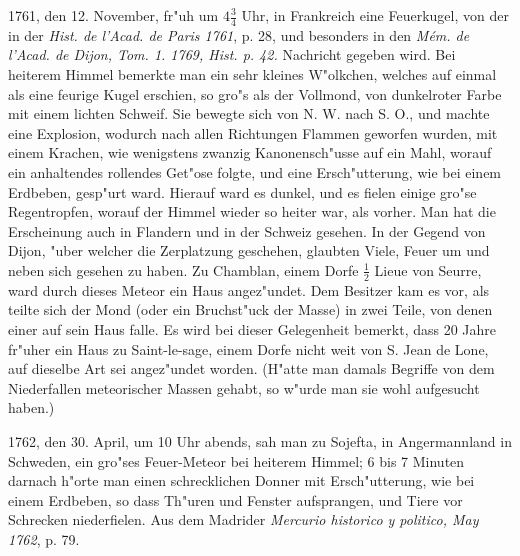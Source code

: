 \documentclass[a4paper, 11pt, oneside, polutonikogreek, german]{article}
\begin{document}
1761, den 12. November, fr"uh um $\mathfrak{4\frac{3}{4}}$ Uhr, in Frankreich eine Feuerkugel, von der in der \emph{Hist. de l'Acad. de Paris 1761}, p. 28, und besonders in den \emph{Mém. de l'Acad. de Dijon, Tom. 1. 1769, Hist. p. 42.} Nachricht gegeben wird. Bei heiterem Himmel bemerkte man ein sehr kleines W"olkchen, welches auf einmal als eine feurige Kugel erschien, so gro"s als der Vollmond, von dunkelroter Farbe mit einem lichten Schweif. Sie bewegte sich von N. W. nach S. O., und machte eine Explosion, wodurch nach allen Richtungen Flammen geworfen wurden, mit einem Krachen, wie wenigstens zwanzig Kanonensch"usse auf ein Mahl, worauf ein anhaltendes rollendes Get"ose folgte, und eine Ersch"utterung, wie bei einem Erdbeben, gesp"urt ward. Hierauf ward es dunkel, und es fielen einige gro"se Regentropfen, worauf der Himmel wieder so heiter war, als vorher. Man hat die Erscheinung auch in Flandern und in der Schweiz gesehen. In der Gegend von Dijon, "uber welcher die Zerplatzung geschehen, glaubten Viele, Feuer um und neben sich gesehen zu haben. Zu Chamblan, einem Dorfe $\mathfrak{\frac{1}{2}}$ Lieue von Seurre, ward durch dieses Meteor ein Haus angez"undet. Dem Besitzer kam es vor, als teilte sich der Mond (oder ein Bruchst"uck der Masse) in zwei Teile, von denen einer auf sein Haus falle. Es wird bei dieser Gelegenheit bemerkt, dass 20 Jahre fr"uher ein Haus zu Saint-le-sage, einem Dorfe nicht weit von S. Jean de Lone, auf dieselbe Art sei angez"undet worden. (H"atte man damals Begriffe von dem Niederfallen meteorischer Massen gehabt, so w"urde man sie wohl aufgesucht haben.)

1762, den 30. April, um 10 Uhr abends, sah man zu Sojefta, in Angermannland in Schweden, ein gro"ses Feuer-Meteor bei heiterem Himmel; 6 bis 7 Minuten darnach h"orte man einen schrecklichen Donner mit Ersch"utterung, wie bei einem Erdbeben, so dass Th"uren und Fenster aufsprangen, und Tiere vor Schrecken niederfielen. Aus dem Madrider \emph{Mercurio historico y politico, May 1762}, p. 79.
\end{document}
